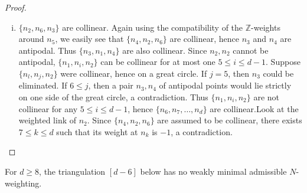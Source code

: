 \begin{proof}
\begin{enumerate}[(i)]
 \item $\{n_2, n_6, n_3\}$ are collinear. Again using the
   compatibility of the $\mathbb{Z}$-weights around $n_5$, we easily
   see that $\{n_4, n_2, n_6\}$ are collinear, hence $n_3$ and $n_4$
   are antipodal. Thus $\{n_3, n_1, n_4\}$ are also collinear. Since
   $n_2, n_2$ cannot be antipodal, $\{n_1, n_i, n_2\}$ can be
   collinear for at most one $5 \leqslant i \leqslant d-1$. Suppose
   $\{n_l, n_j, n_2\}$ were collinear, hence on a great circle. If
   $j=5$, then $n_3$ could be eliminated. If $6 \leqslant j$, then a
   pair $n_3, n_4$ of antipodal points would lie strictly on one side
   of the great circle, a contradiction. Thus $\{n_1, n_i, n_2\}$ are
   not collinear for any $5 \leq i \leq d -1$, hence $\{ n_6, n_7,
   \ldots , n_d\}$ are  
 collinear.\pageoriginale Look at the weighted link of $n_2$. Since
 $\{n_4, n_2,  n_6\}$ are assumed to be collinear, there exists $7
 \leq k \leq d$  such that its weight at $n_k$ is $-1$, a
 contradiction.  
 \end{enumerate}
 \end{proof}

  \begin{lemma}[Nagaya]\label{chap1:lem9.11}
 For $d \geq 8$, the triangulation $[d-6]$ below has no weakly
    minimal admissible $N$-weighting. 
  \end{lemma}

